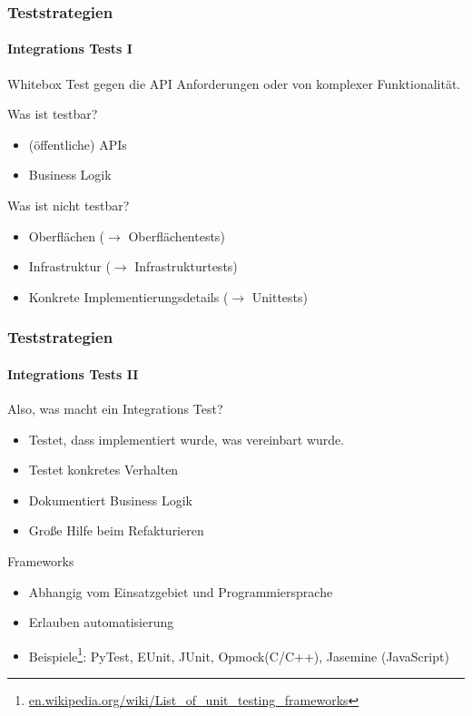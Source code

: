 \begin{frame}
  \frametitle{Teststrategien}
  \framesubtitle{Integrations Tests I}
  Whitebox Test gegen die API Anforderungen oder von komplexer Funktionalität.
  \pause
  \begin{block}{Was ist testbar?}
    \pause
    \begin{itemize}
    \item (öffentliche) APIs
      \pause
    \item Business Logik
      \pause
    \end{itemize}
  \end{block}

  \pause
  \begin{block}{Was ist nicht testbar?}
    \pause
    \begin{itemize}
      \item Oberflächen ($\rightarrow$ Oberflächentests)
        \pause
      \item Infrastruktur ($\rightarrow$ Infrastrukturtests)
        \pause
      \item Konkrete Implementierungsdetails ($\rightarrow$ Unittests)
    \end{itemize}
  \end{block}
\end{frame}

\begin{frame}
  \frametitle{Teststrategien}
  \framesubtitle{Integrations Tests II}

  \begin{block}{Also, was macht ein Integrations Test?}
    \pause
    \begin{itemize}
      \item Testet, dass implementiert wurde, was vereinbart wurde.
        \pause
      \item Testet konkretes Verhalten
        \pause
      \item Dokumentiert Business Logik
        \pause
      \item Große Hilfe beim Refakturieren
    \end{itemize}
  \end{block}

  \pause

  \begin{block}{Frameworks}
    \pause
    \begin{itemize}
      \item Abhangig vom Einsatzgebiet und Programmiersprache
        \pause
      \item Erlauben automatisierung
        \pause
      \item Beispiele\footnote{\url{en.wikipedia.org/wiki/List\_of\_unit\_testing\_frameworks}}:
        PyTest, EUnit, JUnit, Opmock(C/C++), Jasemine (JavaScript)
    \end{itemize}
  \end{block}

\end{frame}
